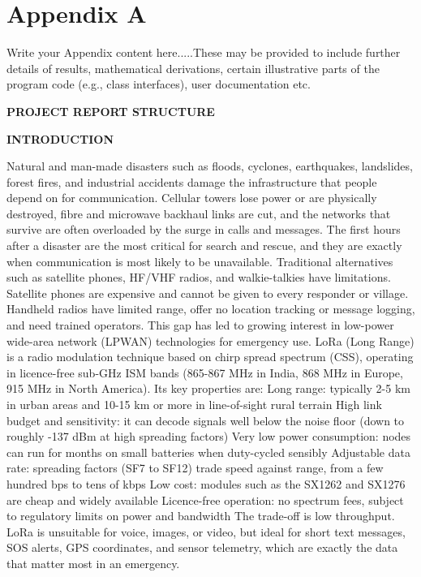
\chapter{Appendix A} %

\label{AppendixA} %


Write your Appendix content here.....These may be provided to include further details of results, mathematical derivations, certain illustrative parts of the program code (e.g., class interfaces), user documentation etc.

\textbf{\Large PROJECT REPORT STRUCTURE}

\textbf{INTRODUCTION}

Natural and man-made disasters such as floods, cyclones, earthquakes, landslides, forest fires, and industrial accidents damage the infrastructure that people depend on for communication. Cellular towers lose power or are physically destroyed, fibre and microwave backhaul links are cut, and the networks that survive are often overloaded by the surge in calls and messages. The first hours after a disaster are the most critical for search and rescue, and they are exactly when communication is most likely to be unavailable.
 Traditional alternatives such as satellite phones, HF/VHF radios, and walkie-talkies have limitations. Satellite phones are expensive and cannot be given to every responder or village. Handheld radios have limited range, offer no location tracking or message logging, and need trained operators. This gap has led to growing interest in low-power wide-area network (LPWAN) technologies for emergency use.
 LoRa (Long Range) is a radio modulation technique based on chirp spread spectrum (CSS), operating in licence-free sub-GHz ISM bands (865-867 MHz in India, 868 MHz in Europe, 915 MHz in North America). Its key properties are:
Long range: typically 2-5 km in urban areas and 10-15 km or more in line-of-sight rural terrain
High link budget and sensitivity: it can decode signals well below the noise floor (down to roughly -137 dBm at high spreading factors) Very low power consumption: nodes can run for months on small batteries when duty-cycled sensibly
Adjustable data rate: spreading factors (SF7 to SF12) trade speed against range, from a few hundred bps to tens of kbps
Low cost: modules such as the SX1262 and SX1276 are cheap and widely available
Licence-free operation: no spectrum fees, subject to regulatory limits on power and bandwidth
The trade-off is low throughput. LoRa is unsuitable for voice, images, or video, but ideal for short text messages, SOS alerts, GPS coordinates, and sensor telemetry, which are exactly the data that matter most in an emergency.


